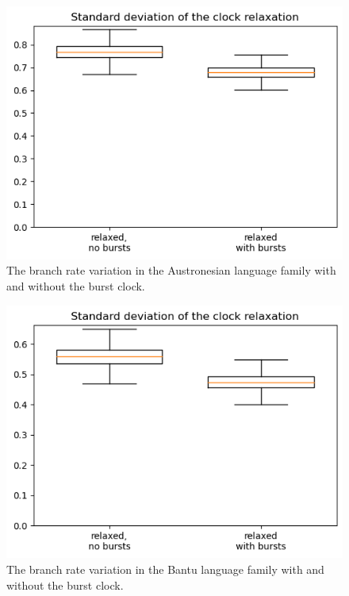 \documentclass[a4paper]{article}
\begin{document}
\begin{figure}
    \centering
    \includegraphics{supplement/analysis/austronesian_clockrates.png}
    \caption{The branch rate variation in the Austronesian language family with and without the burst clock.}
    \label{fig:rate_variation:austronesian}
\end{figure}

\begin{figure}
    \centering
    \includegraphics{supplement/analysis/bantu_clockrates.png}
    \caption{The branch rate variation in the Bantu language family with and without the burst clock.}
    \label{fig:rate_variation:bantu}
\end{figure}
\end{document}
